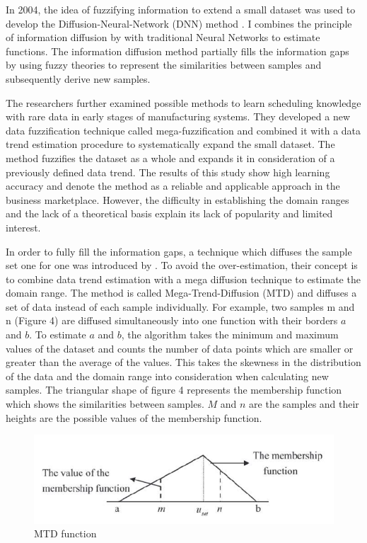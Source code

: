 \documentclass[parskip=full]{scrartcl}
\begin{document}
In 2004, the idea of fuzzifying information to extend a small dataset was used 
to develop the Diffusion-Neural-Network (DNN) method \cite{Huang.2004}. I 
combines the principle of information diffusion by \cite{Huang.1997} with 
traditional Neural Networks to estimate functions. The information diffusion 
method partially fills the information gaps by using fuzzy theories to 
represent the similarities between samples and subsequently derive new samples. 

The researchers \cite{Li.2006b} further examined possible methods to learn
scheduling knowledge with rare data in early stages of manufacturing systems.
They developed a new data fuzzification technique called mega-fuzzification and
combined it with a data trend estimation procedure to systematically expand the
small dataset. The method fuzzifies the dataset as a whole and expands it in
consideration of a previously defined data trend. The results of this study 
show high learning accuracy and denote the method as a reliable and applicable 
approach in the business marketplace. However, the difficulty in establishing 
the domain ranges and the lack of a theoretical basis explain its lack of 
popularity and limited interest. 

In order to fully fill the information gaps, a technique which diffuses the
sample set one for one was introduced by \cite{Li.2007}. To avoid the
over-estimation, their concept is to combine data trend estimation with a mega
diffusion technique to estimate the domain range. The method is called
Mega-Trend-Diffusion (MTD) and diffuses a set of data instead of each sample
individually. For example, two samples m and n (Figure 4) are diffused
simultaneously into one function with their borders $\mathit{a}$ and 
$\mathit{b}$. To estimate $\mathit{a}$ and $\mathit{b}$, the algorithm takes 
the minimum and maximum values of the dataset and counts the number of data 
points which are smaller or greater than the average of the values. This takes 
the skewness in the distribution of the data and the domain range into 
consideration when calculating new samples. The triangular shape of figure 4 
represents the membership function which shows the similarities between 
samples. $\mathit{M}$ and $\mathit{n}$ are the samples and their heights are 
the possible values of the membership function.

\begin{figure}[H]
	\centering
	\includegraphics[width=0.7\linewidth]{"./resources/mtd_function"}
	\caption{MTD function}
	\label{fig:mtd-function}
\end{figure}
\end{document}
